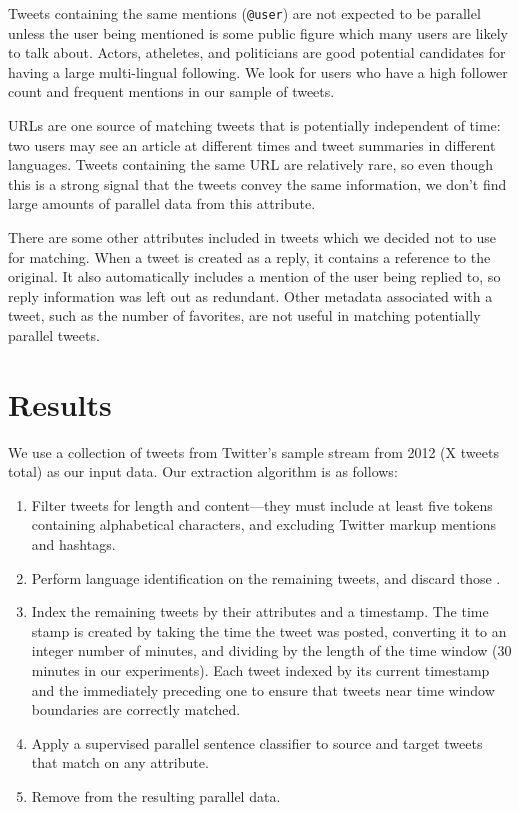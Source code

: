Tweets containing the same mentions ({\tt @user}) are not expected to be
parallel unless the user being mentioned is some public figure which many users
are likely to talk about. Actors, atheletes, and politicians are good potential
candidates for having a large multi-lingual following. We look for users who
have a high follower count and frequent mentions in our sample of tweets.

URLs are one source of matching tweets that is potentially independent of time:
two users may see an article at different times and tweet summaries in different
languages. Tweets containing the same URL are relatively rare, so even though
this is a strong signal that the tweets convey the same information, we don't
find large amounts of parallel data from this attribute.

There are some other attributes included in tweets which we decided not to use
for matching. When a tweet is created as a reply, it contains a reference to the
original. It also automatically includes a mention of the user being replied to,
so reply information was left out as redundant. Other metadata associated with a
tweet, such as the number of favorites, are not useful in matching potentially
parallel tweets.


\section{Results}
We use a collection of tweets from Twitter's sample stream from 2012 (X
tweets total) as our input data. Our extraction algorithm is as follows:

\begin{enumerate}
\item Filter tweets for length and content---they must include at least five
tokens containing alphabetical characters, and excluding Twitter markup 
mentions and hashtags.
\item Perform language identification on the remaining tweets, and discard those
.
\item Index the remaining tweets by their attributes and a timestamp. The time
stamp is created by taking the time the tweet was posted, converting it to an
integer number of minutes, and dividing by the length of the time window (30
minutes in our experiments). Each tweet indexed by its current timestamp and the
immediately preceding one to ensure that tweets near time window boundaries are
correctly matched.
\item Apply a supervised parallel sentence classifier \citep{Smith10} to source and target tweets
that match on any attribute.
\item Remove  from the resulting parallel data.
\end{enumerate}

